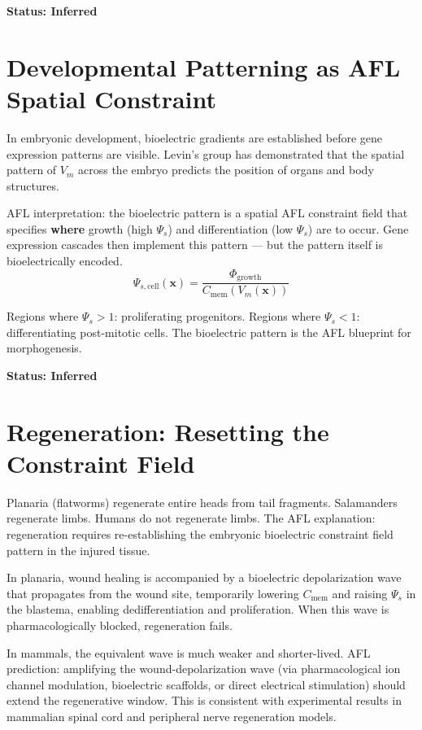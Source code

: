 \documentclass[12pt,a4paper]{article}
\begin{document}
\textbf{Status: Inferred}

\section{Developmental Patterning as AFL Spatial Constraint}

In embryonic development, bioelectric gradients are established before gene expression patterns are visible. Levin's group has demonstrated that the spatial pattern of $V_m$ across the embryo predicts the position of organs and body structures.

AFL interpretation: the bioelectric pattern is a spatial AFL constraint field that specifies \textbf{where} growth (high $\Psi_s$) and differentiation (low $\Psi_s$) are to occur. Gene expression cascades then implement this pattern --- but the pattern itself is bioelectrically encoded.
\begin{equation}
    \Psi_{s,\mathrm{cell}}(\mathbf{x}) = \frac{\Phi_{\mathrm{growth}}}{C_{\mathrm{mem}}(V_m(\mathbf{x}))}
\end{equation}

Regions where $\Psi_s > 1$: proliferating progenitors. Regions where $\Psi_s < 1$: differentiating post-mitotic cells. The bioelectric pattern is the AFL blueprint for morphogenesis.

\textbf{Status: Inferred}

\section{Regeneration: Resetting the Constraint Field}

Planaria (flatworms) regenerate entire heads from tail fragments. Salamanders regenerate limbs. Humans do not regenerate limbs. The AFL explanation: regeneration requires re-establishing the embryonic bioelectric constraint field pattern in the injured tissue.

In planaria, wound healing is accompanied by a bioelectric depolarization wave that propagates from the wound site, temporarily lowering $C_{\mathrm{mem}}$ and raising $\Psi_s$ in the blastema, enabling dedifferentiation and proliferation. When this wave is pharmacologically blocked, regeneration fails.

In mammals, the equivalent wave is much weaker and shorter-lived. AFL prediction: amplifying the wound-depolarization wave (via pharmacological ion channel modulation, bioelectric scaffolds, or direct electrical stimulation) should extend the regenerative window. This is consistent with experimental results in mammalian spinal cord and peripheral nerve regeneration models.
\end{document}

